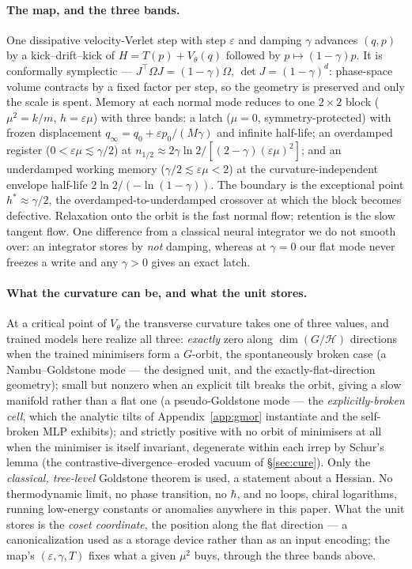 \documentclass{article}
\begin{document}
\paragraph{The map, and the three bands.} One dissipative velocity-Verlet step with step $\varepsilon$ and damping $\gamma$ advances $(q,p)$ by a kick--drift--kick of $H=T(p)+V_\theta(q)$ followed by $p\mapsto(1-\gamma)p$. It is conformally symplectic --- $J^\top\Omega J=(1-\gamma)\Omega$, $\det J=(1-\gamma)^d$: phase-space volume contracts by a fixed factor per step, so the geometry is preserved and only the scale is spent. Memory at each normal mode reduces to one $2\times2$ block ($\mu^2=k/m$, $h=\varepsilon\mu$) with three bands: a latch ($\mu=0$, symmetry-protected) with frozen displacement $q_\infty=q_0+\varepsilon p_0/(M\gamma)$ and infinite half-life; an overdamped register ($0<\varepsilon\mu\lesssim\gamma/2$) at $n_{1/2}\approx2\gamma\ln2/[(2-\gamma)(\varepsilon\mu)^2]$; and an underdamped working memory ($\gamma/2\lesssim\varepsilon\mu<2$) at the curvature-independent envelope half-life $2\ln2/(-\ln(1-\gamma))$. The boundary is the exceptional point $h^*\approx\gamma/2$, the overdamped-to-underdamped crossover at which the block becomes defective. Relaxation onto the orbit is the fast normal flow; retention is the slow tangent flow. One difference from a classical neural integrator we do not smooth over: an integrator stores by \emph{not} damping, whereas at $\gamma=0$ our flat mode never freezes a write and any $\gamma>0$ gives an exact latch.

\paragraph{What the curvature can be, and what the unit stores.} At a critical point of $V_\theta$ the transverse curvature takes one of three values, and trained models here realize all three: \emph{exactly} zero along $\dim(G/\mathcal H)$ directions when the trained minimisers form a $G$-orbit, the spontaneously broken case (a Nambu--Goldstone mode --- the designed unit, and the exactly-flat-direction geometry); small but nonzero when an explicit tilt breaks the orbit, giving a slow manifold rather than a flat one (a pseudo-Goldstone mode --- the \emph{explicitly-broken cell}, which the analytic tilts of Appendix~\ref{app:gmor} instantiate and the self-broken MLP exhibits); and strictly positive with no orbit of minimisers at all when the minimiser is itself invariant, degenerate within each irrep by Schur's lemma (the contrastive-divergence--eroded vacuum of \S\ref{sec:cure}). Only the \emph{classical, tree-level} Goldstone theorem is used, a statement about a Hessian. No thermodynamic limit, no phase transition, no $\hbar$, and no loops, chiral logarithms, running low-energy constants or anomalies anywhere in this paper. What the unit stores is the \emph{coset coordinate}, the position along the flat direction --- a canonicalization used as a storage device rather than as an input encoding; the map's $(\varepsilon,\gamma,T)$ fixes what a given $\mu^2$ buys, through the three bands above.
\end{document}
